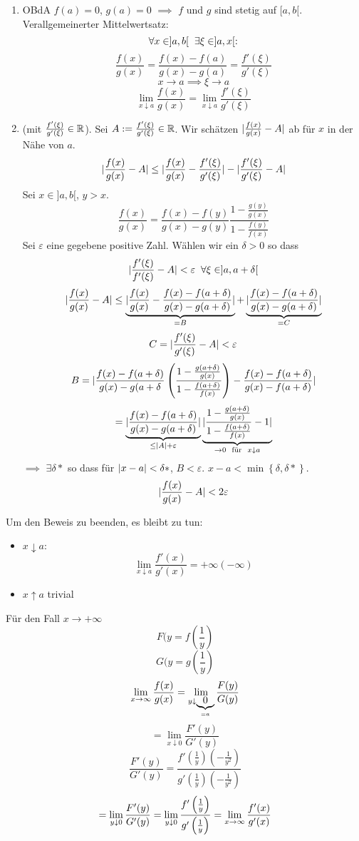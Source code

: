\begin{Bew}
  \begin{enumerate}
    \item 
      OBdA $f(a)=0$, $g(a)=0$ $\implies$ $f$ und $g$ sind stetig auf $[a,b[$. Verallgemeinerter Mittelwertsatz:
      \[\forall x\in ]a,b[\hspace{2mm}\exists \xi\in ]a,x[:\]
      \[\frac{f(x)}{g(x)}=\frac{f(x)-f(a)}{g(x)-g(a)}=\frac{f'(\xi)}{g'(\xi)}\]
      \[x\to a\implies \xi\to a\]
      \[\lim_{x\downarrow a} \frac{f(x)}{g(x)}=\lim_{x\downarrow a} \frac{f'(\xi)}{g'(\xi)}\]
    \item
      (mit $\frac{f'(\xi)}{g'(\xi)}\in\mathbb{R}$). Sei $A:=\frac{f'(\xi)}{g'(\xi)}\in\mathbb{R}$. Wir schätzen $\mathopen| \frac{f(x)}{g(x)}-A \mathclose|$ ab für $x$ in der Nähe von $a$.
      \[\mathopen| \frac{f(x)}{g(x)}-A \mathclose|\leq \mathopen| \frac{f(x)}{g(x)}-\frac{f'(\xi)}{g'(\xi)} \mathclose|-\mathopen| \frac{f'(\xi)}{g'(\xi)}-A \mathclose|\]
      Sei $x\in ]a,b[$, $y>x$.
      \[\frac{f(x)}{g(x)}=\frac{f(x)-f(y)}{g(x)-g(y)}\frac{1-\frac{g(y)}{g(x)}}{1-\frac{f(y)}{f(x)}}\]
      Sei $\varepsilon$ eine gegebene positive Zahl. Wählen wir ein $\delta>0$ so dass
      \[\mathopen| \frac{f'(\xi)}{f'(\xi)}-A \mathclose|<\varepsilon\hspace{2mm}\forall \xi\in ]a,a+\delta[\]
      \[\mathopen| \frac{f(x)}{g(x)}-A \mathclose|\leq \underbrace{\mathopen| \frac{f(x)}{g(x)}-\frac{f(x)-f(a+\delta)}{g(x)-g(a+\delta)} \mathclose|}_{=B}+\underbrace{\mathopen| \frac{f(x)-f(a+\delta)}{g(x)-g(a+\delta)} \mathclose|}_{=C}\]
      \[C=\mathopen| \frac{f'(\xi)}{g'(\xi)}-A \mathclose|<\varepsilon\]
      \[B=\mathopen| \frac{f(x)-f(a+\delta)}{g(x)-g(a+\delta}\left( \frac{1-\frac{g(a+\delta)}{g(x)}}{1-\frac{f(a+\delta)}{f(x)}} \right)-\frac{f(x)-f(a+\delta)}{g(x)-f(a+\delta)} \mathclose|\]
      \[=\underbrace{\mathopen| \frac{f(x)-f(a+\delta)}{g(x)-g(a+\delta)} \mathclose|}_{\leq \mathopen| A \mathclose|+\varepsilon}\underbrace{\mathopen| \frac{1-\frac{g(a+\delta)}{g(x)}}{1-\frac{f(a+\delta)}{f(x)}}-1 \mathclose|}_{\to 0\hspace{2mm}\text{für}\hspace{2mm} x\downarrow a}\]
      $\implies$ $\exists \delta*$ so dass für $\mathopen| x-a \mathclose|<\delta*$, $B<\varepsilon$. $x-a<\min\left\{ \delta,\delta* \right\}$.
      \[\mathopen| \frac{f(x)}{g(x)}-A \mathclose|<2\varepsilon\]
  \end{enumerate}
  Um den Beweis zu beenden, es bleibt zu tun:
  \begin{itemize}
    \item $x\downarrow a$:
      \[\lim_{x\downarrow a}\frac{f'(x)}{g'(x)}=+\infty (-\infty)\]
    \item $x\uparrow a$ trivial
  \end{itemize}
  Für den Fall $x\to +\infty$
  \[F(y=f\left( \frac{1}{y} \right)\]
  \[G(y=g\left( \frac{1}{y} \right)\]
  \[\displaystyle\lim_{x\rightarrow\infty}\frac{f(x)}{g(x)}=\lim_{y\downarrow \underbrace{0}_{=a}}\frac{F(y)}{G(y)}\]
  \[=\lim_{x\downarrow 0}\frac{F'(y)}{G'(y)}\]
  \[\frac{F'(y)}{G'(y)}=\frac{f'\left(\frac{1}{y}\right)\left( -\frac{1}{y^2} \right)}{g'\left( \frac{1}{y} \right)\left( -\frac{1}{y^2} \right)}\]
  \[=\lim_{y\downarrow 0}\frac{F'(y)}{G'(y)}=\lim_{y\downarrow 0}\frac{f'\left( \frac{1}{y} \right)}{g'\left( \frac{1}{y} \right)}=\displaystyle\lim_{x\rightarrow\infty}\frac{f'(x)}{g'(x)}\]
\end{Bew}
